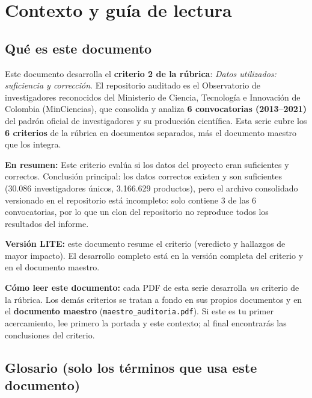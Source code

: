 \section{Contexto y guía de lectura}

\subsection{Qué es este documento}

Este documento desarrolla el \textbf{criterio 2 de la rúbrica}:
\emph{Datos utilizados: suficiencia y corrección}. El repositorio auditado es el
Observatorio de investigadores reconocidos del Ministerio de Ciencia,
Tecnología e Innovación de Colombia (MinCiencias), que consolida y analiza
\textbf{6 convocatorias (2013--2021)} del padrón oficial de investigadores
y su producción científica. Esta serie cubre los \textbf{6 criterios} de la
rúbrica en documentos separados, más el documento maestro que los integra.

\textbf{En resumen:} Este criterio evalúa si los datos del proyecto eran suficientes y correctos. Conclusión principal: los datos correctos existen y son suficientes (30.086 investigadores únicos, 3.166.629 productos), pero el archivo consolidado versionado en el repositorio está incompleto: solo contiene 3 de las 6 convocatorias, por lo que un clon del repositorio no reproduce todos los resultados del informe.


\begin{tcolorbox}[nota]\textbf{Versión LITE:} este documento resume el criterio (veredicto y hallazgos de mayor impacto). El desarrollo completo está en la versión completa del criterio y en el documento maestro.\end{tcolorbox}

\begin{tcolorbox}[nota]
\textbf{Cómo leer este documento:} cada PDF de esta serie desarrolla \emph{un}
criterio de la rúbrica. Los demás criterios se tratan a fondo en sus propios
documentos y en el \textbf{documento maestro} (\texttt{maestro\_auditoria.pdf}).
Si este es tu primer acercamiento, lee primero la portada y este contexto; al
final encontrarás las conclusiones del criterio.
\end{tcolorbox}

\subsection{Glosario (solo los términos que usa este documento)}

